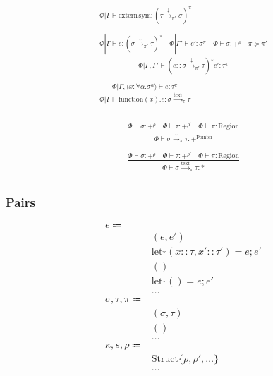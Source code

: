 \documentclass {article}
\begin{document}
\begin{gather*}
\frac
{}
{\Phi | \Gamma \vdash \text{extern} \, \text{sym} : (\tau \xrightarrow{\downarrow}_{\pi'} \sigma)^\pi} \\
\\
\frac
{\Phi | \Gamma \vdash e : (\sigma \xrightarrow{\downarrow}_{\pi'} \tau)^\pi \quad \Phi | \Gamma' \vdash e' : \sigma^\pi \quad \Phi \vdash \sigma : +^{\rho} \quad \pi \succeq \pi'}
{\Phi | \Gamma, \Gamma' \vdash (e :: \sigma \xrightarrow{\downarrow}_{\pi'} \tau)^\downarrow e' : \tau^\pi} \\
\\
\frac
{\Phi | \Gamma, \langle x : \forall \alpha. \sigma^\alpha \rangle \vdash e : \tau^\pi}
{\Phi | \Gamma \vdash \text{function}(x). e : \sigma \xrightarrow{\text{text}}_\pi \tau} \\
\end{gather*}

\begin{gather*}
\frac
{\Phi \vdash \sigma : +^{\rho} \quad \Phi \vdash \tau : +^{\rho'} \quad \Phi \vdash \pi : \text{Region}}
{\Phi \vdash \sigma \xrightarrow{\downarrow}_\pi \tau : +^{\text{Pointer}}} \\
\\
\frac
{\Phi \vdash \sigma : +^{\rho} \quad \Phi \vdash \tau : +^{\rho'} \quad \Phi \vdash \pi : \text{Region}}
{\Phi \vdash \sigma \xrightarrow{\text{text}}_\pi \tau : *} \\
\end{gather*}

\subsubsection{Pairs}
\begin{align*}
e \Coloneqq & \\
& (e, e') \tag{Pair Introduction} \\
& \text{let}^\downarrow (x :: \tau, x' :: \tau') = e; e' \tag{Pair Elimination} \\
& () \tag{Unit Introduction} \\
& \text{let}^\downarrow () = e; e' \tag{Unit Elimination} \\
& \dots \\
\sigma, \tau, \pi \Coloneqq & \\
& (\sigma, \tau) \tag{Pair} \\
& () \tag{Unit} \\
& \dots \\
\kappa, s, \rho \Coloneqq & \\
& \text{Struct} \{ \rho, \rho', \dots \} \tag{Struct Representation} \\
& \dots
\end{align*}
\end{document}
